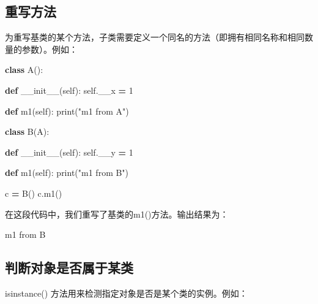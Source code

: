 \documentclass[]{ctexbook}
\newenvironment{Shaded}{\begin{snugshade}}{\end{snugshade}}
\newcommand{\BuiltInTok}[1]{#1}
\newcommand{\DecValTok}[1]{\textcolor[rgb]{0.00,0.00,0.81}{#1}}
\newcommand{\FunctionTok}[1]{\textcolor[rgb]{0.00,0.00,0.00}{#1}}
\newcommand{\ImportTok}[1]{#1}
\newcommand{\KeywordTok}[1]{\textcolor[rgb]{0.13,0.29,0.53}{\textbf{#1}}}
\newcommand{\NormalTok}[1]{#1}
\newcommand{\OperatorTok}[1]{\textcolor[rgb]{0.81,0.36,0.00}{\textbf{#1}}}
\newcommand{\StringTok}[1]{\textcolor[rgb]{0.31,0.60,0.02}{#1}}
\newcommand{\VariableTok}[1]{\textcolor[rgb]{0.00,0.00,0.00}{#1}}
\begin{document}
\hypertarget{ux91cdux5199ux65b9ux6cd5}{%
\subsection{重写方法}\label{ux91cdux5199ux65b9ux6cd5}}

为重写基类的某个方法，子类需要定义一个同名的方法（即拥有相同名称和相同数量的参数）。例如：

\begin{Shaded}
\begin{Highlighting}[]
\KeywordTok{class}\NormalTok{ A():}

    \KeywordTok{def} \FunctionTok{__init__}\NormalTok{(}\VariableTok{self}\NormalTok{):}
        \VariableTok{self}\NormalTok{.__x }\OperatorTok{=} \DecValTok{1}

    \KeywordTok{def}\NormalTok{ m1(}\VariableTok{self}\NormalTok{):}
        \BuiltInTok{print}\NormalTok{(}\StringTok{"m1 from A"}\NormalTok{)}

\KeywordTok{class}\NormalTok{ B(A):}

    \KeywordTok{def} \FunctionTok{__init__}\NormalTok{(}\VariableTok{self}\NormalTok{):}
        \VariableTok{self}\NormalTok{.__y }\OperatorTok{=} \DecValTok{1}

    \KeywordTok{def}\NormalTok{ m1(}\VariableTok{self}\NormalTok{):}
        \BuiltInTok{print}\NormalTok{(}\StringTok{"m1 from B"}\NormalTok{)}

\NormalTok{c }\OperatorTok{=}\NormalTok{ B()}
\NormalTok{c.m1()}
\end{Highlighting}
\end{Shaded}

在这段代码中，我们重写了基类的m1()方法。输出结果为：

\begin{Shaded}
\begin{Highlighting}[]
\NormalTok{m1 }\ImportTok{from}\NormalTok{ B}
\end{Highlighting}
\end{Shaded}

\hypertarget{ux5224ux65adux5bf9ux8c61ux662fux5426ux5c5eux4e8eux67d0ux7c7b}{%
\subsection{判断对象是否属于某类}\label{ux5224ux65adux5bf9ux8c61ux662fux5426ux5c5eux4e8eux67d0ux7c7b}}

isinstance() 方法用来检测指定对象是否是某个类的实例。例如：
\end{document}
